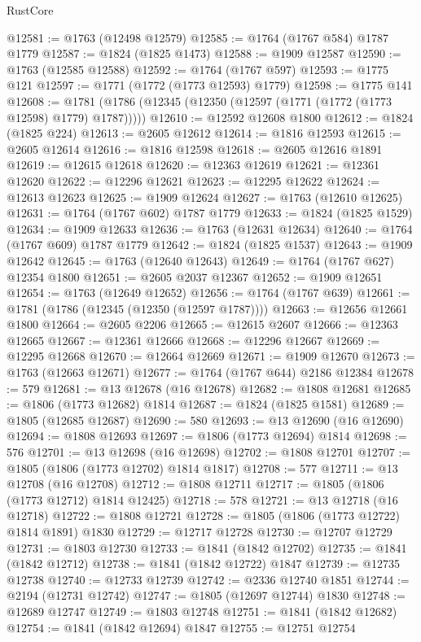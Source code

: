 \begin{lexlean}{RustCore}
\begin{coremodule}
@12581 := @1763 (@12498 @12579)
@12585 := @1764 (@1767 @584) @1787 @1779
@12587 := @1824 (@1825 @1473)
@12588 := @1909 @12587
@12590 := @1763 (@12585 @12588)
@12592 := @1764 (@1767 @597)
@12593 := @1775 @121
@12597 := @1771 (@1772 (@1773 @12593) @1779)
@12598 := @1775 @141
@12608 := @1781 (@1786 (@12345 (@12350 (@12597 (@1771 (@1772 (@1773 @12598) @1779) @1787)))))
@12610 := @12592 @12608 @1800
@12612 := @1824 (@1825 @224)
@12613 := @2605 @12612
@12614 := @1816 @12593
@12615 := @2605 @12614
@12616 := @1816 @12598
@12618 := @2605 @12616 @1891
@12619 := @12615 @12618
@12620 := @12363 @12619
@12621 := @12361 @12620
@12622 := @12296 @12621
@12623 := @12295 @12622
@12624 := @12613 @12623
@12625 := @1909 @12624
@12627 := @1763 (@12610 @12625)
@12631 := @1764 (@1767 @602) @1787 @1779
@12633 := @1824 (@1825 @1529)
@12634 := @1909 @12633
@12636 := @1763 (@12631 @12634)
@12640 := @1764 (@1767 @609) @1787 @1779
@12642 := @1824 (@1825 @1537)
@12643 := @1909 @12642
@12645 := @1763 (@12640 @12643)
@12649 := @1764 (@1767 @627) @12354 @1800
@12651 := @2605 @2037 @12367
@12652 := @1909 @12651
@12654 := @1763 (@12649 @12652)
@12656 := @1764 (@1767 @639)
@12661 := @1781 (@1786 (@12345 (@12350 (@12597 @1787))))
@12663 := @12656 @12661 @1800
@12664 := @2605 @2206
@12665 := @12615 @2607
@12666 := @12363 @12665
@12667 := @12361 @12666
@12668 := @12296 @12667
@12669 := @12295 @12668
@12670 := @12664 @12669
@12671 := @1909 @12670
@12673 := @1763 (@12663 @12671)
@12677 := @1764 (@1767 @644) @2186 @12384
@12678 := 579
@12681 := @13 @12678 (@16 @12678)
@12682 := @1808 @12681
@12685 := @1806 (@1773 @12682) @1814
@12687 := @1824 (@1825 @1581)
@12689 := @1805 (@12685 @12687)
@12690 := 580
@12693 := @13 @12690 (@16 @12690)
@12694 := @1808 @12693
@12697 := @1806 (@1773 @12694) @1814
@12698 := 576
@12701 := @13 @12698 (@16 @12698)
@12702 := @1808 @12701
@12707 := @1805 (@1806 (@1773 @12702) @1814 @1817)
@12708 := 577
@12711 := @13 @12708 (@16 @12708)
@12712 := @1808 @12711
@12717 := @1805 (@1806 (@1773 @12712) @1814 @12425)
@12718 := 578
@12721 := @13 @12718 (@16 @12718)
@12722 := @1808 @12721
@12728 := @1805 (@1806 (@1773 @12722) @1814 @1891) @1830
@12729 := @12717 @12728
@12730 := @12707 @12729
@12731 := @1803 @12730
@12733 := @1841 (@1842 @12702)
@12735 := @1841 (@1842 @12712)
@12738 := @1841 (@1842 @12722) @1847
@12739 := @12735 @12738
@12740 := @12733 @12739
@12742 := @2336 @12740 @1851
@12744 := @2194 (@12731 @12742)
@12747 := @1805 (@12697 @12744) @1830
@12748 := @12689 @12747
@12749 := @1803 @12748
@12751 := @1841 (@1842 @12682)
@12754 := @1841 (@1842 @12694) @1847
@12755 := @12751 @12754

\end{coremodule}
\end{lexlean}

